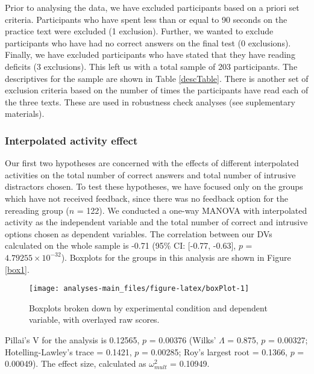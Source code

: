 \documentclass[11pt,]{article}
\begin{document}
Prior to analysing the data, we have excluded participants based on a
priori set criteria. Participants who have spent less than or equal to
90 seconds on the practice text were excluded (1 exclusion). Further, we
wanted to exclude participants who have had no correct answers on the
final test (0 exclusions). Finally, we have excluded participants who
have stated that they have reading deficits (3 exclusions). This left us
with a total sample of 203 participants. The descriptives for the sample
are shown in Table \ref{descTable}. There is another set of exclusion
criteria based on the number of times the participants have read each of
the three texts. These are used in robustness check analyses (see
suplementary materials).

\hypertarget{interpolated-activity-effect}{%
\subsubsection{Interpolated activity
effect}\label{interpolated-activity-effect}}

Our first two hypotheses are concerned with the effects of different
interpolated activities on the total number of correct answers and total
number of intrusive distractors chosen. To test these hypotheses, we
have focused only on the groups which have not received feedback, since
there was no feedback option for the rereading group (\(n\) = 122). We
conducted a one-way MANOVA with interpolated activity as the independent
variable and the total number of correct and intrusive options chosen as
dependent variables. The correlation between our DVs calculated on the
whole sample is -0.71 (95\% CI: {[}-0.77, -0.63{]}, \(p\) =
\(4.79255\times 10^{-32}\)). Boxplots for the groups in this analysis
are shown in Figure \ref{box1}.

\begin{figure*}

{\centering \texttt{[image: analyses-main\_files/figure-latex/boxPlot-1]} 

}

\caption{\label{box1} Boxplots broken down by experimental condition and dependent variable, with overlayed raw scores.}\label{fig:boxPlot}
\end{figure*}

Pillai's V for the analysis is 0.12565, \(p\) = 0.00376 (Wilks'
\(\Lambda\) = 0.875, \(p\) = 0.00327; Hotelling-Lawley's trace = 0.1421,
\(p\) = 0.00285; Roy's largest root = 0.1366, \(p\) = 0.00049). The
effect size, calculated as \(\omega^2_{mult}\) = 0.10949.
\end{document}
